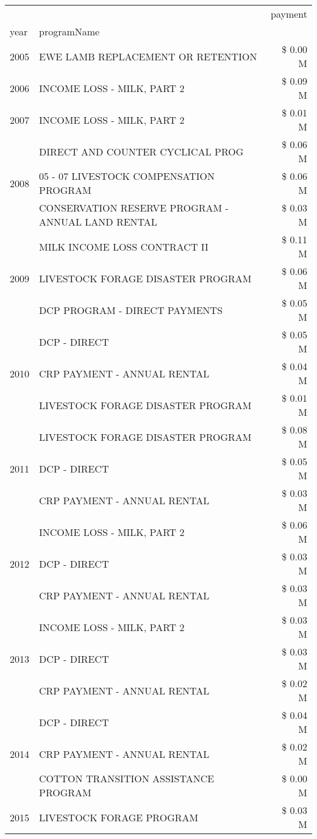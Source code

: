 \begin{tabular}{llr}
\toprule
 &  & payment \\
year & programName &  \\
\midrule
2005 & EWE LAMB REPLACEMENT OR RETENTION & \$ 0.00 M \\
\cline{1-3}
2006 & INCOME LOSS - MILK, PART 2 & \$ 0.09 M \\
\cline{1-3}
2007 & INCOME LOSS - MILK, PART 2 & \$ 0.01 M \\
\cline{1-3}
\multirow[t]{3}{*}{2008} & DIRECT AND COUNTER CYCLICAL PROG & \$ 0.06 M \\
 & 05 - 07 LIVESTOCK COMPENSATION PROGRAM & \$ 0.06 M \\
 & CONSERVATION RESERVE PROGRAM - ANNUAL LAND RENTAL & \$ 0.03 M \\
\cline{1-3}
\multirow[t]{3}{*}{2009} & MILK INCOME LOSS CONTRACT II & \$ 0.11 M \\
 & LIVESTOCK FORAGE DISASTER  PROGRAM & \$ 0.06 M \\
 & DCP PROGRAM - DIRECT PAYMENTS & \$ 0.05 M \\
\cline{1-3}
\multirow[t]{3}{*}{2010} & DCP - DIRECT & \$ 0.05 M \\
 & CRP PAYMENT - ANNUAL RENTAL & \$ 0.04 M \\
 & LIVESTOCK FORAGE DISASTER PROGRAM & \$ 0.01 M \\
\cline{1-3}
\multirow[t]{3}{*}{2011} & LIVESTOCK FORAGE DISASTER PROGRAM & \$ 0.08 M \\
 & DCP - DIRECT & \$ 0.05 M \\
 & CRP PAYMENT - ANNUAL RENTAL & \$ 0.03 M \\
\cline{1-3}
\multirow[t]{3}{*}{2012} & INCOME LOSS - MILK, PART 2 & \$ 0.06 M \\
 & DCP - DIRECT & \$ 0.03 M \\
 & CRP PAYMENT - ANNUAL RENTAL & \$ 0.03 M \\
\cline{1-3}
\multirow[t]{3}{*}{2013} & INCOME LOSS - MILK, PART 2 & \$ 0.03 M \\
 & DCP - DIRECT & \$ 0.03 M \\
 & CRP PAYMENT - ANNUAL RENTAL & \$ 0.02 M \\
\cline{1-3}
\multirow[t]{3}{*}{2014} & DCP - DIRECT & \$ 0.04 M \\
 & CRP PAYMENT - ANNUAL RENTAL & \$ 0.02 M \\
 & COTTON TRANSITION ASSISTANCE PROGRAM & \$ 0.00 M \\
\cline{1-3}
\multirow[t]{3}{*}{2015} & LIVESTOCK FORAGE PROGRAM & \$ 0.03 M \\

\end{tabular}
